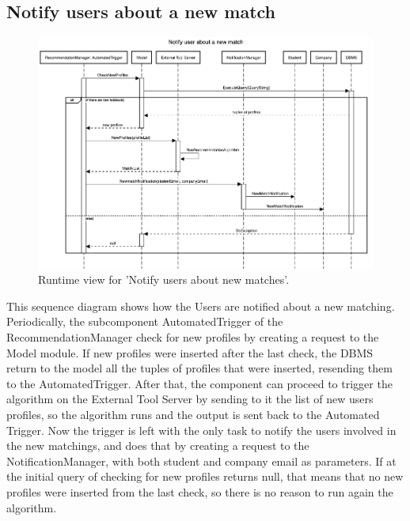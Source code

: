 \subsection{Notify users about a new match}
\begin{figure}[H]
    \begin{center}
        \includegraphics[width=0.8\linewidth]{DD/LaTeX/Images/RuntimeView/NotifyUserAboutANewMatch.png}
        \caption{Runtime view for 'Notify users about new matches'.}
        \label{fig:runtime_NotifyMatches}%
    \end{center}
\end{figure}

This sequence diagram shows how the Users are notified about a new matching. Periodically, the subcomponent AutomatedTrigger of the RecommendationManager check for new profiles by creating a request to the Model module. If new profiles were inserted after the last check, the DBMS return to the model all the tuples of profiles that were inserted, resending them to the AutomatedTrigger. After that, the component can proceed to trigger the algorithm on the External Tool Server by sending to it the list of new users profiles, so the algorithm runs and the output is sent back to the Automated Trigger. Now the trigger is left with the only task to notify the users involved in the new matchings, and does that by creating a request to the NotificationManager, with both student and company email as parameters. If at the initial query of checking for new profiles returns null, that means that no new profiles were inserted from the last check, so there is no reason to run again the algorithm.






